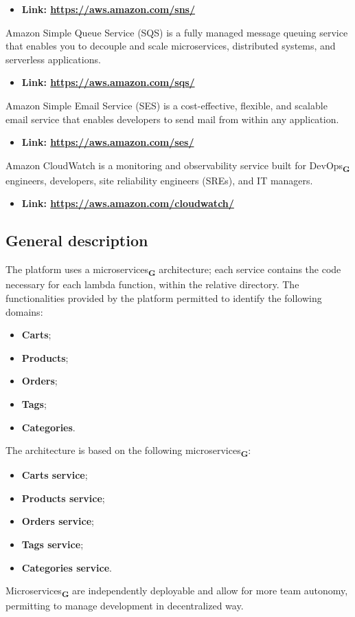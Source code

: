\begin{itemize}
    \item \textbf{Link: \url{https://aws.amazon.com/sns/}}
\end{itemize}
Amazon Simple Queue Service (SQS) is a fully managed message queuing service that enables you to decouple and scale microservices, distributed systems, and serverless applications.
\begin{itemize}
    \item \textbf{Link: \url{https://aws.amazon.com/sqs/}}
\end{itemize}
Amazon Simple Email Service (SES) is a cost-effective, flexible, and scalable email service that enables developers to send mail from within any application.
\begin{itemize}
    \item \textbf{Link: \url{https://aws.amazon.com/ses/}}
\end{itemize}
Amazon CloudWatch is a monitoring and observability service built for DevOps\textsubscript{\textbf{G}} engineers, developers, site reliability engineers (SREs), and IT managers.
\begin{itemize}
    \item \textbf{Link: \url{https://aws.amazon.com/cloudwatch/}}
\end{itemize}

\subsection{General description}
The platform uses a microservices\textsubscript{\textbf{G}} architecture; each service contains the code necessary for each lambda function, within the relative directory.
The functionalities provided by the platform permitted to identify the following domains:
\begin{itemize}
    \item \textbf{Carts};
    \item \textbf{Products};
    \item \textbf{Orders};
    \item \textbf{Tags};
    \item \textbf{Categories}.
\end{itemize}
The architecture is based on the following microservices\textsubscript{\textbf{G}}:
\begin{itemize}
    \item \textbf{Carts service};
    \item \textbf{Products service};
    \item \textbf{Orders service};
    \item \textbf{Tags service};
    \item \textbf{Categories service}.
\end{itemize}
Microservices\textsubscript{\textbf{G}} are independently deployable and allow for more team autonomy, permitting to manage development in decentralized way.
\pagebreak
